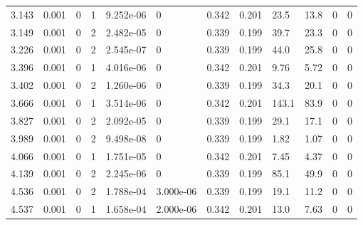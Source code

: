 \documentclass[preview]{standalone}
\begin{document}
{{\begin{tabular}{L{1.2cm}C{1.2cm} C{0.3cm}C{0.5cm} C{1.4cm}C{1.4cm} C{1.4cm}C{1.4cm} C{1.6cm}C{1.6cm} C{1.6cm}C{1.6cm}}
  3.143  &  0.001  & 0     &  1 &  9.252e-06  & 0  &  0.342&   0.201& 23.5 & 13.8   &  0 & 0  \\ 
  3.149  &  0.001  & 0     &  2 &  2.482e-05  & 0  &  0.339&   0.199& 39.7 & 23.3   &  0 & 0  \\ 
  3.226  &  0.001  & 0     &  2 &  2.545e-07  & 0  &  0.339&   0.199& 44.0 & 25.8   &  0 & 0  \\ 
  3.396  &  0.001  & 0     &  1 &  4.016e-06  & 0  &  0.342&   0.201& 9.76 & 5.72   &  0 & 0  \\ 
  3.402  &  0.001  & 0     &  2 &  1.260e-06  & 0  &  0.339&   0.199& 34.3 & 20.1   &  0 & 0  \\ 
  3.666  &  0.001  & 0     &  1 &  3.514e-06  & 0  &  0.342&   0.201& 143.1 & 83.9   &  0 & 0  \\ 
  3.827  &  0.001  & 0     &  2 &  2.092e-05  & 0  &  0.339&   0.199& 29.1 & 17.1   &  0 & 0  \\ 
  3.989  &  0.001  & 0     &  2 &  9.498e-08  & 0  &  0.339&   0.199& 1.82 & 1.07   &  0 & 0  \\ 
  4.066  &  0.001  & 0     &  1 &  1.751e-05  & 0  &  0.342&   0.201& 7.45 & 4.37   &  0 & 0  \\ 
  4.139  &  0.001  & 0     &  2 &  2.245e-06  & 0  &  0.339&   0.199& 85.1 & 49.9   &  0 & 0  \\ 
  4.536  &  0.001  & 0     &  2 &  1.788e-04  & 3.000e-06  &  0.339&   0.199& 19.1 & 11.2   &  0 & 0  \\ 
  4.537  &  0.001  & 0     &  1 &  1.658e-04  & 2.000e-06  &  0.342&   0.201& 13.0 & 7.63   &  0 & 0  \\ 
\hline 
\end{tabular} 

}}
\end{document}
